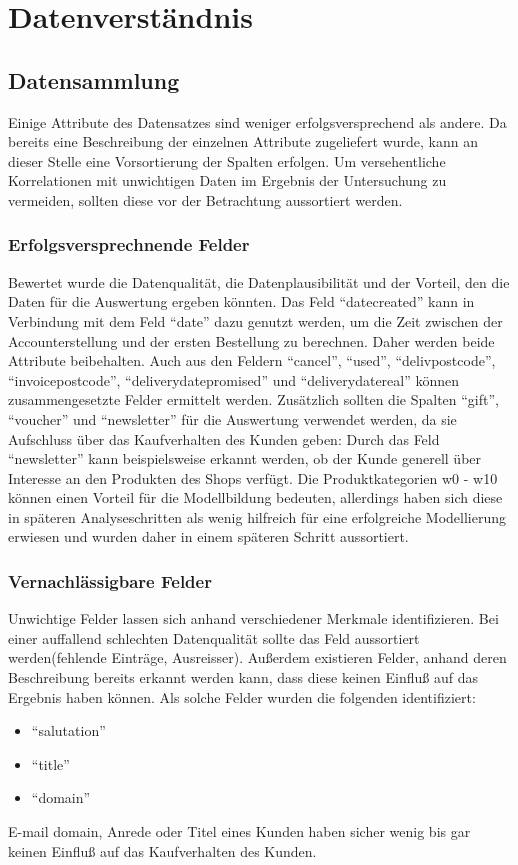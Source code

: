\documentclass[a4paper,12pt]{article}
\begin{document}
\section{Datenverständnis}
\subsection{Datensammlung}
Einige Attribute des Datensatzes sind weniger erfolgsversprechend als andere. Da bereits eine
Beschreibung der einzelnen Attribute zugeliefert wurde, kann an dieser Stelle eine Vorsortierung
der Spalten erfolgen. Um versehentliche Korrelationen mit unwichtigen Daten im Ergebnis der
Untersuchung zu vermeiden, sollten diese vor der Betrachtung aussortiert werden.

\subsubsection{Erfolgsversprechnende Felder}
Bewertet wurde die Datenqualität, die Datenplausibilität und der
Vorteil, den die Daten für die Auswertung ergeben könnten. Das Feld "`datecreated"' kann in Verbindung
mit dem Feld "`date"' dazu genutzt werden, um die Zeit zwischen der Accounterstellung
und der ersten Bestellung zu berechnen. Daher werden beide Attribute beibehalten. Auch aus
den Feldern "`cancel"', "`used"', "`delivpostcode"', "`invoicepostcode"', "`deliverydatepromised"' und "`deliverydatereal"'
können zusammengesetzte Felder ermittelt werden.
Zusätzlich sollten die Spalten "`gift"', "`voucher"' und "`newsletter"' für die Auswertung verwendet werden, da sie Aufschluss über das Kaufverhalten des Kunden geben: Durch das Feld
"`newsletter"' kann beispielsweise erkannt werden, ob der Kunde generell über Interesse an den Produkten
des Shops verfügt. Die Produktkategorien w0 - w10 können einen Vorteil für die Modellbildung
bedeuten, allerdings haben sich diese in späteren Analyseschritten als wenig hilfreich für eine
erfolgreiche Modellierung erwiesen und wurden daher in einem späteren Schritt aussortiert.

\subsubsection{Vernachlässigbare Felder}
Unwichtige Felder lassen sich anhand verschiedener Merkmale identifizieren. Bei einer
auffallend schlechten Datenqualität sollte das Feld aussortiert werden(fehlende Einträge, Ausreisser).
Außerdem existieren Felder, anhand deren Beschreibung bereits erkannt werden
kann, dass diese keinen Einfluß auf das Ergebnis haben können. Als solche Felder wurden die folgenden identifiziert:
\begin{itemize}
	\item "`salutation"'
	\item "`title"'
	\item "`domain"'
\end{itemize}
E-mail domain, Anrede oder Titel eines Kunden haben sicher wenig bis gar keinen Einfluß auf das Kaufverhalten des Kunden.
\end{document}
